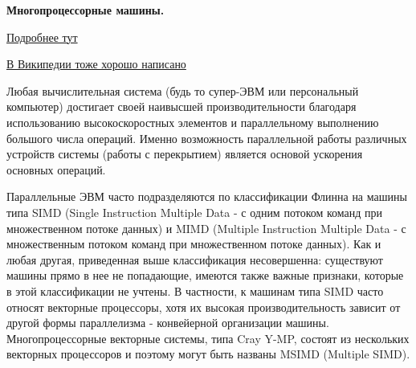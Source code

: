 \textbf{Многопроцессорные машины.}

\href{https://docstore.mik.ua/skbd/glava_10.htm}{Подробнее тут}

\href{https://ru.wikipedia.org/wiki/%D0%9C%D0%BD%D0%BE%D0%B3%D0%BE%D0%BF%D1%80%D0%BE%D1%86%D0%B5%D1%81%D1%81%D0%BE%D1%80%D0%BD%D0%BE%D1%81%D1%82%D1%8C}{В Википедии тоже хорошо написано}

Любая вычислительная система (будь то супер-ЭВМ или персональный компьютер) достигает своей наивысшей производительности благодаря использованию высокоскоростных элементов и параллельному выполнению большого числа операций. Именно возможность параллельной работы различных устройств системы (работы с перекрытием) является основой ускорения основных операций. 

Параллельные ЭВМ часто подразделяются по классификации Флинна на машины типа SIMD (Single Instruction Multiple Data - с одним потоком команд при множественном потоке данных) и MIMD (Multiple Instruction Multiple Data - с множественным потоком команд при множественном потоке данных). Как и любая другая, приведенная выше классификация несовершенна: существуют машины прямо в нее не попадающие, имеются также важные признаки, которые в этой классификации не учтены. В частности, к машинам типа SIMD часто относят векторные процессоры, хотя их высокая производительность зависит от другой формы параллелизма - конвейерной организации машины. Многопроцессорные векторные системы, типа Cray Y-MP, состоят из нескольких векторных процессоров и поэтому могут быть названы MSIMD (Multiple SIMD).

